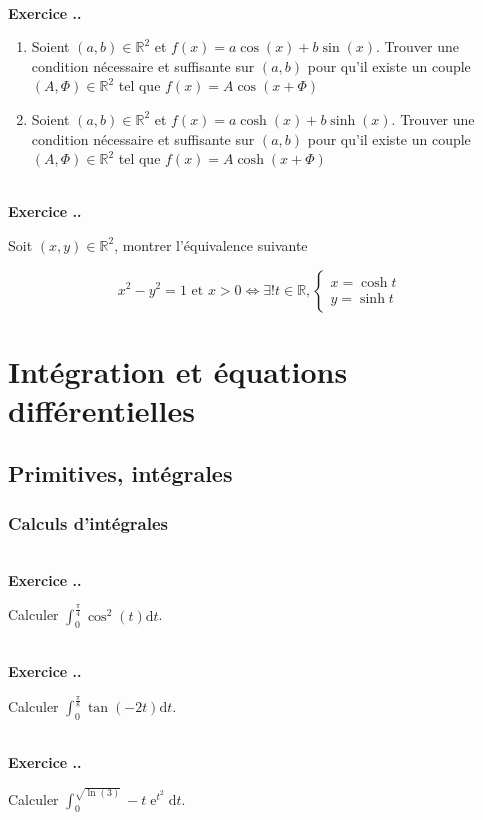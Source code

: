 \documentclass{article}
\newcommand{\di}{\mathrm{d}}
\newcommand{\ex}{{\operatorname{e}}}
\newcommand{\mb}[1]{\mathbb{#1}}
\newcounter{exo}
\newcommand{\exercice}[1][\null]{\textbf{\\ Exercice \thesection.\theexo. #1} \addtocounter{exo}{1}}
\begin{document}
\exercice

\begin{enumerate}

    \item Soient $(a,b) \in \mb{R}^2$ et $f(x) = a \cos(x) + b \sin(x)$.
Trouver une condition nécessaire et suffisante sur $(a,b)$
pour qu'il existe un couple $(A,\Phi) \in \mb{R}^2$ tel que 
$f(x) = A \cos (x + \Phi)$

    \item Soient $(a,b) \in \mb{R}^2$ et $f(x) = a \cosh(x) + b \sinh(x)$.
Trouver une condition nécessaire et suffisante sur $(a,b)$
pour qu'il existe un couple $(A,\Phi) \in \mb{R}^2$ tel que 
$f(x) = A \cosh (x + \Phi)$
\end{enumerate}

\exercice

Soit $(x,y) \in \mb{R}^2$, montrer l'équivalence suivante 

\begin{equation*}
    x^2-y^2=1\text{ et }x>0
    \iff
    \exists! t \in \mb{R},
    \begin{cases}
        x = \cosh t \\
        y = \sinh t 
    \end{cases}
\end{equation*}





\section{Intégration et équations différentielles}

\subsection{Primitives, intégrales}

\subsubsection{Calculs d'intégrales}

\exercice

Calculer $\displaystyle \int_{0}^{\frac{\pi}{4}} \cos^2(t) \di t$.

\exercice

Calculer $\displaystyle \int_{0}^{\frac{\pi}{8}} \tan(-2t) \di t$.

\exercice

Calculer $\displaystyle \int_{0}^{\sqrt{\ln(3)}} -t\ex^{t^2} \di t$.
\end{document}
